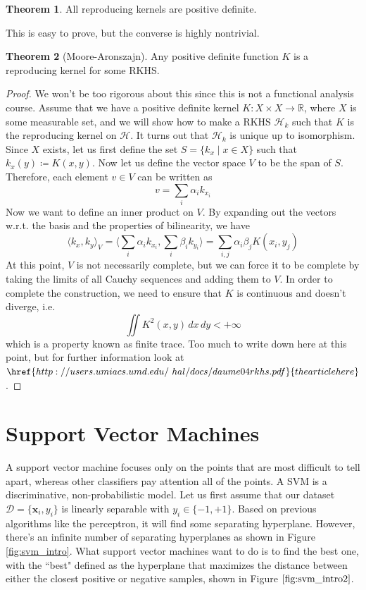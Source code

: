 \documentclass{article}
\theoremstyle{definition}
\newtheorem{theorem}{Theorem}[section]
\theoremstyle{remark}
\theoremstyle{definition}
\begin{document}
\begin{theorem} 
   All reproducing kernels are positive definite.  
\end{theorem} 

This is easy to prove, but the converse is highly nontrivial. 

\begin{theorem}[Moore-Aronszajn] 
   Any positive definite function $K$ is a reproducing kernel for some RKHS.  
\end{theorem} 
\begin{proof} 
    We won't be too rigorous about this since this is not a functional analysis course. Assume that we have a positive definite kernel $K: X \times X \rightarrow \mathbb{R}$, where $X$ is some measurable set, and we will show how to make a RKHS $\mathcal{H}_k$ such that $K$ is the reproducing kernel on $\mathcal{H}$. It turns out that $\mathcal{H}_k$ is unique up to isomorphism. Since $X$ exists, let us first define the set $S = \{ k_x \mid x \in X\}$ such that $k_x (y) \coloneqq K(x, y)$. Now let us define the vector space $V$ to be the span of $S$. Therefore, each element $v \in V$ can be written as 
    \[v = \sum_i \alpha_i k_{x_i}\]
    Now we want to define an inner product on $V$. By expanding out the vectors w.r.t. the basis and the properties of bilinearity, we have 
    \[\langle k_x, k_y \rangle_{V} = \bigg\langle \sum_i \alpha_i k_{x_i} , \sum_i \beta_i k_{y_i} \bigg\rangle = \sum_{i, j} \alpha_i \beta_j K(x_i, y_j)\] 
    At this point, $V$ is not necessarily complete, but we can force it to be complete by taking the limits of all Cauchy sequences and adding them to $V$. In order to complete the construction, we need to ensure that $K$ is continuous and doesn't diverge, i.e. 
    \[\iint K^2 (x, y) \,dx\,dy < +\infty\]
    which is a property known as finite trace. Too much to write down here at this point, but for further information look at $\href{http://users.umiacs.umd.edu/~hal/docs/daume04rkhs.pdf}{the article here}$. 
\end{proof}


\section{Support Vector Machines}

A support vector machine focuses only on the points that are most difficult to tell apart, whereas other classifiers pay attention all of the points. A SVM is a discriminative, non-probabilistic model. Let us first assume that our dataset $\mathcal{D} = \{\mathbf{x}_i, y_i\}$ is linearly separable with $y_i \in \{-1, +1\}$. Based on previous algorithms like the perceptron, it will find some separating hyperplane. However, there's an infinite number of separating hyperplanes as shown in Figure \ref{fig:svm_intro}. What support vector machines want to do is to find the best one, with the ``best" defined as the hyperplane that maximizes the distance between either the closest positive or negative samples, shown in Figure $\ref{fig:svm_intro2}$.  
\end{document}

